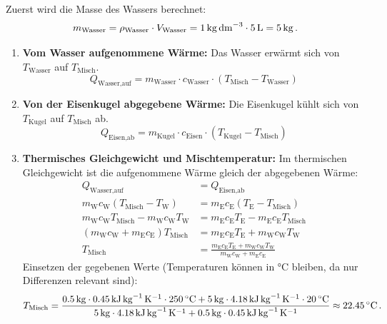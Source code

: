 \documentclass[ngerman]{scrreprt}
\newenvironment{loesungbox}[1]
  {\needspace{5\baselineskip}\begin{loesungboxstyle}[frametitle={#1}]}
  {\end{loesungboxstyle}}
\begin{document}
\begin{loesungbox}{Lösung zu \Cref{aufg:mischtemperatur}}
Zuerst wird die Masse des Wassers berechnet:
\begin{equation}\label{eq: mischtemperatur_mw}
     m_{\text{Wasser}} = \rho_{\text{Wasser}} \cdot V_{\text{Wasser}} = \SI{1}{\kilogram\per\deci\metre\cubed} \cdot \SI{5}{\litre} = \SI{5}{\kilogram} \mDot
\end{equation}
\begin{enumerate}
    \item \textbf{Vom Wasser aufgenommene Wärme:} Das Wasser erwärmt sich von $T_{\text{Wasser}}$ auf $T_{\text{Misch}}$.
    \begin{equation}\label{eq: mischtemperatur_q_auf}
        Q_{\text{Wasser,auf}} = m_{\text{Wasser}} \cdot c_{\text{Wasser}} \cdot (T_{\text{Misch}} - T_{\text{Wasser}})
    \end{equation}
    \item \textbf{Von der Eisenkugel abgegebene Wärme:} Die Eisenkugel kühlt sich von $T_{\text{Kugel}}$ auf $T_{\text{Misch}}$ ab.
    \begin{equation}\label{eq: mischtemperatur_q_ab}
        Q_{\text{Eisen,ab}} = m_{\text{Kugel}} \cdot c_{\text{Eisen}} \cdot (T_{\text{Kugel}} - T_{\text{Misch}})
    \end{equation}
    \item \textbf{Thermisches Gleichgewicht und Mischtemperatur:} Im thermischen Gleichgewicht ist die aufgenommene Wärme gleich der abgegebenen Wärme:
    \begin{align}
        Q_{\text{Wasser,auf}} &= Q_{\text{Eisen,ab}} \nonumber\\
        m_{\text{W}} c_{\text{W}} (T_{\text{Misch}} - T_{\text{W}}) &= m_{\text{E}} c_{\text{E}} (T_{\text{E}} - T_{\text{Misch}}) \nonumber\\
        m_{\text{W}} c_{\text{W}} T_{\text{Misch}} - m_{\text{W}} c_{\text{W}} T_{\text{W}} &= m_{\text{E}} c_{\text{E}} T_{\text{E}} - m_{\text{E}} c_{\text{E}} T_{\text{Misch}}\nonumber \\
        (m_{\text{W}} c_{\text{W}} + m_{\text{E}} c_{\text{E}}) T_{\text{Misch}} &= m_{\text{E}} c_{\text{E}} T_{\text{E}} + m_{\text{W}} c_{\text{W}} T_{\text{W}} \nonumber\\
        T_{\text{Misch}} &= \frac{m_{\text{E}} c_{\text{E}} T_{\text{E}} + m_{\text{W}} c_{\text{W}} T_{\text{W}}}{m_{\text{W}} c_{\text{W}} + m_{\text{E}} c_{\text{E}}} \label{eq: mischtemperatur_formel}
    \end{align}
    Einsetzen der gegebenen Werte (Temperaturen können in \si{\celsius} bleiben, da nur Differenzen relevant sind):
    \begin{equation}
        T_{\text{Misch}} = \frac{ \SI{0.5}{\kg} \cdot \SI{0.45}{\kilo\joule\per\kg\per\kelvin} \cdot \SI{250}{\celsius} + \SI{5}{\kg} \cdot \SI{4.18}{\kilo\joule\per\kg\per\kelvin} \cdot \SI{20}{\celsius}}{ \SI{5}{\kg} \cdot \SI{4.18}{\kilo\joule\per\kg\per\kelvin} + \SI{0.5}{\kg} \cdot \SI{0.45}{\kilo\joule\per\kg\per\kelvin}} \approx \SI{22.45}{\celsius} \mDot
    \end{equation}
\end{enumerate}
\end{loesungbox}
\end{document}
